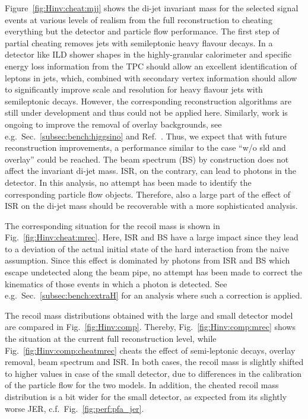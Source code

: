 Figure~\ref{fig:Hinv:cheat:mjj} shows the di-jet invariant mass for the selected signal events at various levels of realism from the full reconstruction to cheating everything but the detector and particle flow performance. The first step of partial cheating removes jets with semileptonic heavy flavour decays. In a detector like ILD shower shapes in the highly-granular calorimeter and specific energy loss information from the TPC should allow an
excellent identification of leptons in jets, which, combined with secondary vertex information
should allow to significantly improve scale and resolution for heavy flavour jets with semileptonic decays. However, the corresponding reconstruction algorithms are still under development and thus could not be applied here. Similarly, work is ongoing to improve the
removal of overlay backgrounds, see e.g.\ Sec.~\ref{subsec:bench:higgsino} and Ref.~\cite{Boronat:2014hva}. Thus, we expect that with future reconstruction improvements, a performance similar to the case ``w/o sld and overlay'' could be reached. The beam spectrum (BS) by construction does not affect the invariant di-jet mass. ISR, on the contrary, can lead to photons in the detector. In this analysis, no attempt has been made to identify the corresponding particle flow objects. Therefore, also a large part of the effect of ISR on the di-jet mass should be recoverable with a more sophisticated analysis. 

The corresponding situation for the recoil mass is shown in Fig.~\ref{fig:Hinv:cheat:mrec}.
Here, ISR and BS have a large impact since they lead to a deviation of the actual initial state of the hard interaction from the naive assumption. Since this effect is dominated by photons from ISR and BS which escape undetected along the beam pipe, no attempt has been made to correct the kinematics of those events in which a photon is detected. See e.g.\ Sec.~\ref{subsec:bench:extraH} for an analysis where such a correction is applied. 

The recoil mass distributions obtained with the large and small detector model are compared in Fig.~\ref{fig:Hinv:comp}. Thereby, Fig.~\ref{fig:Hinv:comp:mrec} shows the situation at the current full reconstruction level, while Fig.~\ref{fig:Hinv:comp:cheatmrec} cheats the effect of semi-leptonic decays, overlay removal, beam spectrum and ISR. In both cases, the recoil  mass is slightly shifted to higher values in case of the small detector, due to differences 
in the calibration of the particle flow for the two models. In addition, the cheated recoil mass distribution is a bit wider for the small detector, as expected from its slightly worse
JER, c.f.\ Fig.~\ref{fig:perf:pfa_jer}.

